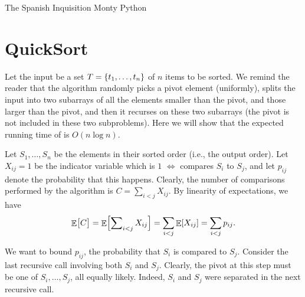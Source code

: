 %





\ChapterPrefix{}
\ChapterGen{}

\noindent%
%
{The Spanish Inquisition}%
{ Monty Python}



\section{QuickSort}

Let the input be a set $T = \left\{ {t_1,\ldots,t_n} \right\}$ of $n$ items to be
sorted. We remind the reader that the \QuickSort{} algorithm randomly
picks a pivot element (uniformly), splits the input into two subarrays of
all the elements smaller than the pivot, and those larger than the pivot,
and then it recurses on these two subarrays (the pivot is not included in
these two subproblems). Here we will show that the expected running time
of \QuickSort is $O(n\log n)$.




Let $S_1, \ldots, S_n$ be the elements in their sorted order (i.e., the output
order).  Let $X_{ij}=1$ be the indicator variable which is $1$ $\iff$
\QuickSort{} compares $S_i$ to $S_j$, and let $p_{ij}$ denote the
probability that this happens. Clearly, the number of comparisons
performed by the algorithm is $C = \sum_{i<j} X_{ij}$.  By linearity of
expectations, we have
\begin{align*}
  \Ex{\bigl. C}%
  =%
  \Ex{ \sum\nolimits_{i < j} X_{ij}}%
  =%
  \sum_{i < j} \Ex{X_{ij}}%
  =%
  \sum_{i<j} p_{ij}.
\end{align*}

We want to bound $p_{ij}$, the probability that $S_i$ is compared to
$S_j$.  Consider the last recursive call involving both $S_i$ and
$S_j$. Clearly, the pivot at this step must be one of $S_i,\ldots,S_j$, all
equally likely. Indeed, $S_i$ and $S_j$ were separated in the next
recursive call.

